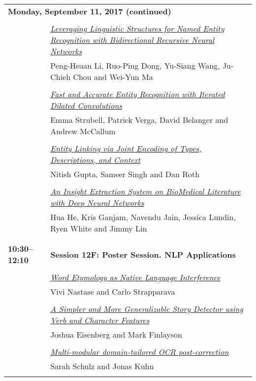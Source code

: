 \begin{tabular}{p{20mm}p{128mm}}
\\
\multicolumn{2}{l}{\bf Monday, September 11, 2017 (continued)} \\\\
 & \hyperlink{page.2647}{\em Leveraging Linguistic Structures for Named Entity Recognition with Bidirectional Recursive Neural Networks}\\
         & Peng-Hsuan Li, Ruo-Ping Dong, Yu-Siang Wang, Ju-Chieh Chou and Wei-Yun Ma \\
\\

 & \hyperlink{page.2653}{\em Fast and Accurate Entity Recognition with Iterated Dilated Convolutions}\\
         & Emma Strubell, Patrick Verga, David Belanger and Andrew McCallum \\
\\

 & \hyperlink{page.2664}{\em Entity Linking via Joint Encoding of Types, Descriptions, and Context}\\
         & Nitish Gupta, Sameer Singh and Dan Roth \\
\\

 & \hyperlink{page.2674}{\em An Insight Extraction System on BioMedical Literature with Deep Neural Networks}\\
         & Hua He, Kris Ganjam, Navendu Jain, Jessica Lundin, Ryen White and Jimmy Lin \\
\\

\\{\bf 10:30--12:10} & {\bf Session 12F: Poster Session. NLP Applications } \\
\\
 & \hyperlink{page.2685}{\em Word Etymology as Native Language Interference}\\
         & Vivi Nastase and Carlo Strapparava \\
\\

 & \hyperlink{page.2691}{\em A Simpler and More Generalizable Story Detector using Verb and Character Features}\\
         & Joshua Eisenberg and Mark Finlayson \\
\\

 & \hyperlink{page.2699}{\em Multi-modular domain-tailored OCR post-correction}\\
         & Sarah Schulz and Jonas Kuhn \\
\\


\end{tabular}
